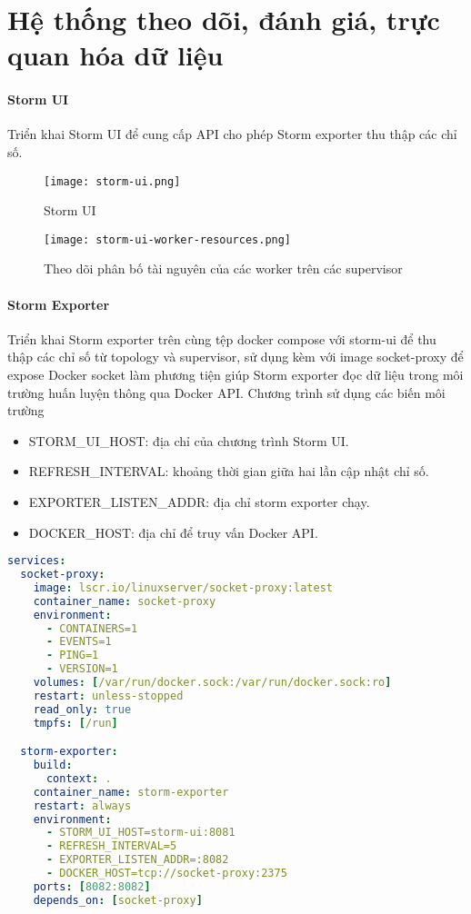 \section{Hệ thống theo dõi, đánh giá, trực quan hóa dữ liệu}

\paragraph{Storm UI}

Triển khai Storm UI để cung cấp API cho phép Storm exporter thu thập các chỉ số.

\begin{figure}[H]
    \centering
    \texttt{[image: storm-ui.png]}
    \caption{Storm UI}
\end{figure}

\begin{figure}
    \centering
    \texttt{[image: storm-ui-worker-resources.png]}
    \caption{Theo dõi phân bố tài nguyên của các worker trên các supervisor}
\end{figure}

\paragraph{Storm Exporter}

Triển khai Storm exporter trên cùng tệp docker compose với storm-ui để thu thập các chỉ số từ topology và supervisor, sử dụng kèm với image socket-proxy \autocite{linuxserver_socket-proxy} để expose Docker socket làm phương tiện giúp Storm exporter đọc dữ liệu trong môi trường huấn luyện thông qua Docker API. Chương trình sử dụng các biến môi trường
\begin{itemize}
    \item STORM\_UI\_HOST: địa chỉ của chương trình Storm UI.
    \item REFRESH\_INTERVAL: khoảng thời gian giữa hai lần cập nhật chỉ số.
    \item EXPORTER\_LISTEN\_ADDR: địa chỉ storm exporter chạy.
    \item DOCKER\_HOST: địa chỉ để truy vấn Docker API.
\end{itemize}

\begin{lstlisting}[language=yaml, caption={Cấu hình triển khai Storm exporter}]
services:
  socket-proxy:
    image: lscr.io/linuxserver/socket-proxy:latest
    container_name: socket-proxy
    environment:
      - CONTAINERS=1
      - EVENTS=1
      - PING=1
      - VERSION=1
    volumes: [/var/run/docker.sock:/var/run/docker.sock:ro]
    restart: unless-stopped
    read_only: true
    tmpfs: [/run]

  storm-exporter:
    build:
      context: .
    container_name: storm-exporter
    restart: always
    environment:
      - STORM_UI_HOST=storm-ui:8081
      - REFRESH_INTERVAL=5
      - EXPORTER_LISTEN_ADDR=:8082
      - DOCKER_HOST=tcp://socket-proxy:2375
    ports: [8082:8082]
    depends_on: [socket-proxy]
\end{lstlisting}

